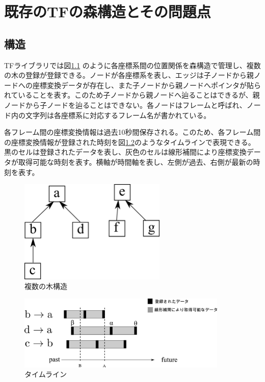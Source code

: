 \documentclass[a4paper]{jreport}	%
\begin{document}
\chapter{既存のTFの森構造とその問題点}
\section{構造}
TFライブラリでは図\ref{fig:multitree} のように各座標系間の位置関係を森構造で管理し、複数の木の登録が登録できる。ノードが各座標系を表し、エッジは子ノードから親ノードへの座標変換データが存在し、また子ノードから親ノードへポインタが貼られていることを表す。このため子ノードから親ノードへ辿ることはできるが、親ノードから子ノードを辿ることはできない。各ノードはフレームと呼ばれ、ノード内の文字列は各座標系に対応するフレーム名が書かれている。

各フレーム間の座標変換情報は過去10秒間保存される。このため、各フレーム間の座標変換情報が登録された時刻を図\ref{fig:general-timeline}のようなタイムラインで表現できる。黒のセルは登録されたデータを表し、灰色のセルは線形補間により座標変換データが取得可能な時刻を表す。横軸が時間軸を表し、左側が過去、右側が最新の時刻を表す。

\begin{figure}[h] 
\centering
\includegraphics[width=7cm]{multitree.png}	
\caption{複数の木構造}
\label{fig:multitree}
\end{figure}

\begin{figure}[h] 
\centering
\includegraphics[width=10cm]{general-timeline.png}
\caption{タイムライン}
\label{fig:general-timeline}
\end{figure}
\end{document}
